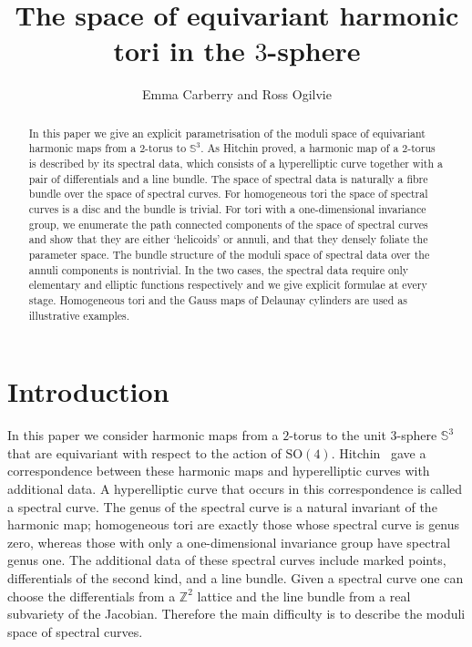 \documentclass{article}
\numberwithin{equation}{section}
\numberwithin{figure}{section}
\renewcommand{\S}{\mathbb{S}}
\newcommand{\SO}{\mathrm{SO}}
\begin{document}
\title{The space of equivariant harmonic tori in the $3$-sphere}
\author{Emma Carberry and Ross Ogilvie}
\date{}
\maketitle

\begin{abstract}
In this paper we give an explicit parametrisation of the moduli space of equivariant harmonic maps from a $2$-torus to $\S^3$. 
As Hitchin proved, a harmonic map of a $2$-torus is described by its spectral data, which consists of a hyperelliptic curve together with a pair of differentials and a line bundle. The space of spectral data is naturally a fibre bundle over the space of spectral curves.
For homogeneous tori the space of spectral curves is a disc and the bundle is trivial.
For tori with a one-dimensional invariance group, we enumerate the path connected components of the space of spectral curves and show that they are either `helicoids' or annuli, and that they densely foliate the parameter space. The bundle structure of the moduli space of spectral data over the annuli components is nontrivial.
In the two cases, the spectral data require only elementary and elliptic functions respectively and we give explicit formulae at every stage.
Homogeneous tori and the Gauss maps of Delaunay cylinders are used as illustrative examples.
\end{abstract}

\section{Introduction}\label{sec:Introduction}

In this paper we consider harmonic maps from a $2$-torus to the unit $3$-sphere $\S^3$ that are equivariant with respect to the action of $\SO(4)$.
Hitchin~\cite{Hitchin1990} gave a correspondence between these harmonic maps and hyperelliptic curves with additional data. A hyperelliptic curve that occurs in this correspondence is called a spectral curve. 
The genus of the spectral curve is a natural invariant of the harmonic map; homogeneous tori are exactly those whose spectral curve is genus zero, whereas those with only a one-dimensional invariance group have spectral genus one.
The additional data of these spectral curves include marked points, differentials of the second kind, and a line bundle. 
Given a spectral curve one can choose the differentials from a $\mathbb{Z}^2$ lattice and the line bundle from a real subvariety of the Jacobian. Therefore the main difficulty is to describe the moduli space of spectral curves.
\end{document}
